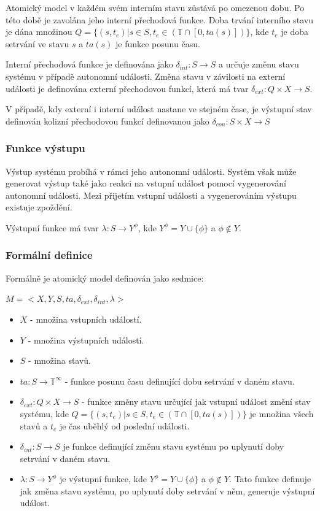 Atomický model v každém svém interním stavu zůstává po omezenou dobu. Po této době je zavolána jeho interní přechodová funkce. Doba trvání interního stavu je dána množinou $Q=\{(s,t_e)|s \in S, t_e \in (\mathbb{T} \cap [0, ta(s)])\}$, kde $t_e$ je doba setrvání ve stavu $s$ a $ta(s)$ je funkce posunu času.

Interní přechodová funkce je definována jako $\delta_{int}:S \rightarrow S$ a určuje změnu stavu systému v případě autonomní události. Změna stavu v závilosti na externí události je definována externí přechodovou funkcí, která má tvar $\delta_{ext}:Q \times X \rightarrow  S$.

V případě, kdy externí i interní událost nastane ve stejném čase, je výstupní stav definován kolizní přechodovou funkcí definovanou jako $\delta_{con}:S \times X \rightarrow  S$

\subsubsection{Funkce výstupu}

Výstup systému probíhá v rámci jeho autonomní události. Systém však může generovat výstup také jako reakci na vstupní událost pomocí vygenerování autonomní události. Mezi přijetím vstupní události a vygenerováním výstupu existuje zpoždění.

Výstupní funkce má tvar $\lambda:S \rightarrow  Y^\phi$, kde $Y^\phi=Y \cup \{\phi\}$ a $\phi \not\in Y$.

\subsubsection{Formální definice}

Formálně je atomický model definován jako sedmice:

\begin{math}
M=<X,Y,S,ta, \delta_{ext}, \delta_{int}, \lambda>
\end{math}

\begin{itemize}
\item $X$ - množina vstupních událostí.
\item $Y$ - množina výstupních událostí.
\item $S$ - množina stavů.
\item $ta:S \rightarrow \mathbb{T}^\infty$ - funkce posunu času definující dobu setrvání v daném stavu.
\item $\delta_{ext}:Q \times X \rightarrow  S$ - funkce změny stavu určující jak vstupní událost změní stav systému, kde $Q=\{(s,t_e)|s \in S, t_e \in (\mathbb{T} \cap [0, ta(s)])\}$ je množina všech stavů a $t_e$ je čas uběhlý od poslední události.
\item $\delta_{int}:S \rightarrow S$ je funkce definující změnu stavu systému po uplynutí doby setrvání v daném stavu.
\item $\lambda:S \rightarrow  Y^\phi$ je výstupní funkce, kde $Y^\phi=Y \cup \{\phi\}$ a $\phi \not\in Y$. Tato funkce definuje jak změna stavu systému, po uplynutí doby setrvání v něm, generuje výstupní událost.
\end{itemize}

